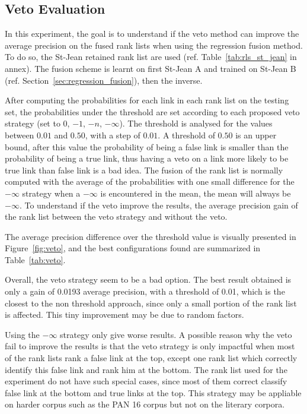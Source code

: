 \subsection{Veto Evaluation}

In this experiment, the goal is to understand if the veto method can improve the average precision on the fused rank lists when using the regression fusion method.
To do so, the St-Jean retained rank list are used (ref. Table~\ref{tab:rls_st_jean} in annex).
The fusion scheme is learnt on first St-Jean A and trained on St-Jean B (ref. Section~\ref{sec:regression_fusion}), then the inverse.

After computing the probabilities for each link in each rank list on the testing set, the probabilities under the threshold are set according to each proposed veto strategy (set to $0$, $-1$, $-n$, $-\infty$).
The threshold is analysed for the values between $0.01$ and $0.50$, with a step of $0.01$.
A threshold of $0.50$ is an upper bound, after this value the probability of being a false link is smaller than the probability of being a true link, thus having a veto on a link more likely to be true link than false link is a bad idea.
The fusion of the rank list is normally computed with the average of the probabilities with one small difference for the $-\infty$ strategy when a $-\infty$ is encountered in the mean, the mean will always be $-\infty$.
To understand if the veto improve the results, the average precision gain of the rank list between the veto strategy and without the veto.

The average precision difference over the threshold value is visually presented in Figure~\ref{fig:veto}, and the best configurations found are summarized in Table~\ref{tab:veto}.

Overall, the veto strategy seem to be a bad option.
The best result obtained is only a gain of 0.0193 average precision, with a threshold of 0.01, which is the closest to the non threshold approach, since only a small portion of the rank list is affected.
This tiny improvement may be due to random factors.

Using the $-\infty$ strategy only give worse results.
A possible reason why the veto fail to improve the results is that the veto strategy is only impactful when most of the rank lists rank a false link at the top, except one rank list which correctly identify this false link and rank him at the bottom.
The rank list used for the experiment do not have such special cases, since most of them correct classify false link at the bottom and true links at the top.
This strategy may be appliable on harder corpus such as the PAN 16 corpus but not on the literary corpora.

